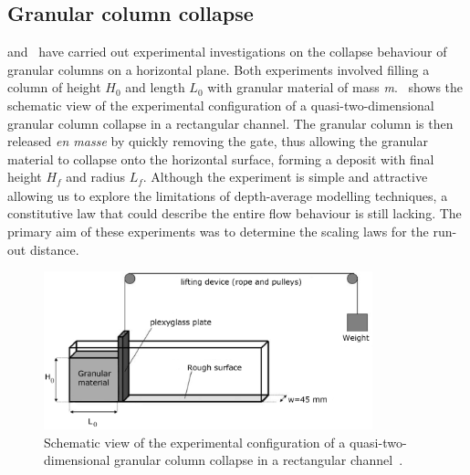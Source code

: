 \subsection{Granular column collapse}

\citet{Lube2005} and~\citet{Lajeunesse2004} have carried out experimental 
investigations on the collapse behaviour of granular columns on a horizontal 
plane. Both experiments involved filling a column of height 
$\textit{H}_{\textit{0}}$ and length $\textit{L}_{\textit{0}}$ with granular 
material of mass \textit{m}.~ shows the schematic view of the 
experimental configuration of a quasi-two-dimensional granular column collapse 
in a rectangular channel. The granular column is then released \textit{en 
masse} by quickly removing the gate, thus allowing the granular material to 
collapse onto the horizontal surface, forming a deposit with final height 
$\textit{H}_{\textit{f}}$ and radius $\textit{L}_{\textit{f}}$. Although the 
experiment is simple and attractive allowing us to explore the limitations of 
depth-average modelling techniques, a constitutive law that could describe the 
entire flow behaviour is still lacking. The primary aim of these experiments 
was to determine the scaling laws for the run-out distance.


\begin{figure}[tbhp]
\centering
\includegraphics[width=0.85\textwidth]{experiment_setup}
\caption{Schematic view of the experimental configuration of a 
quasi-two-dimensional granular column 
collapse in a rectangular channel~\citep{Lajeunesse2004}.}
\label{fig:exp}
\end{figure}

